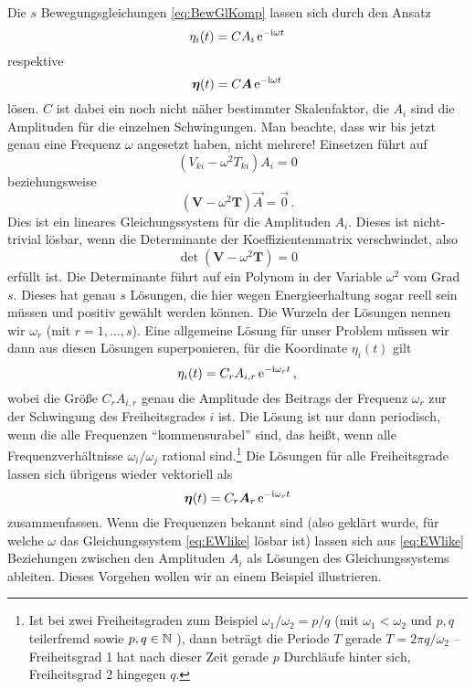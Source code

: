 \documentclass[paper=a4, fontsize=11.0pt, abstractoff, DIV12]{scrartcl}
\begin{document}
Die $s$ Bewegungsgleichungen \eqref{eq:BewGlKomp} lassen sich durch den Ansatz
\begin{equation}
\eta_i(t) = C A_i \,{\mathrm{e}}^{-\mathrm{i} \omega t}
\end{equation}
respektive
\begin{equation}
{\ensuremath{\boldsymbol{\eta}}}(t) = C {\boldsymbol{A}} \,{\mathrm{e}}^{-\mathrm{i} \omega t}
\end{equation}
lösen. $C$ ist dabei ein noch nicht näher bestimmter Skalenfaktor, die $A_i$
sind die Amplituden für die einzelnen Schwingungen. Man beachte, dass wir
bis jetzt genau eine Frequenz $\omega$ angesetzt haben, nicht mehrere!
Einsetzen führt auf
\begin{equation}
\left(V_{ki} - \omega^2 T_{ki} \right)A_i = 0
\end{equation}
beziehungsweise
\begin{equation}
\left(\mathbf{V} - \omega^2\mathbf{T}\right)\vec{A} = \vec 0\, .
\label{eq:EWlike}
\end{equation}
Dies ist ein lineares Gleichungssystem für die Amplituden $A_i$. Dieses ist
nicht-trivial lösbar, wenn die Determinante der Koeffizientenmatrix
verschwindet, also
\begin{equation}
\det \left(\mathbf{V} - \omega^2\mathbf{T} \right) = 0
\label{eq:Det}
\end{equation}
erfüllt ist. Die Determinante führt auf ein Polynom in der Variable
$\omega^2$ vom Grad $s$. Dieses hat genau $s$ Lösungen, die hier wegen
Energieerhaltung sogar reell sein müssen und positiv gewählt werden können.
Die Wurzeln der Lösungen nennen wir $\omega_r$ (mit $r=1,\dots,s$). Eine
allgemeine Lösung für unser Problem müssen wir dann aus diesen Lösungen
superponieren, für die Koordinate $\eta_i(t)$ gilt
\begin{equation}
\eta_i(t) = C_r A_{i,r} \,{\mathrm{e}}^{-\mathrm{i} \omega_r t}\, ,
\label{eq:SchwingR}
\end{equation}
wobei die Größe $C_r A_{i,r}$ genau die Amplitude des Beitrags der Frequenz
$\omega_r$ zur der Schwingung des Freiheitsgrades $i$ ist. Die Lösung ist
nur dann periodisch, wenn die alle Frequenzen ``kommensurabel'' sind, das
heißt, wenn alle Frequenzverhältnisse $\omega_i/\omega_j$ rational
sind.\footnote{Ist bei zwei Freiheitsgraden zum Beispiel $\omega_1/\omega_2 = p/q$
(mit $\omega_1 < \omega_2$ und $p,q$ teilerfremd sowie $p,q \in \mathbb{N}$
), dann beträgt die Periode $T$ gerade $T=2\pi q/\omega_2$ -- Freiheitsgrad
1 hat nach dieser Zeit gerade $p$ Durchläufe hinter sich, Freiheitsgrad 2
hingegen $q$.} Die Lösungen für alle Freiheitsgrade lassen sich übrigens
wieder vektoriell als
\begin{equation}
{\ensuremath{\boldsymbol{\eta}}}(t) = C_r {\boldsymbol{A}}_r \,{\mathrm{e}}^{-\mathrm{i}\omega_r t}
\label{eq:BewLsg}
\end{equation}
zusammenfassen. Wenn die Frequenzen bekannt sind (also geklärt wurde, für
welche $\omega$ das Gleichungssystem \eqref{eq:EWlike} lösbar ist) lassen sich
aus \eqref{eq:EWlike} Beziehungen zwischen den Amplituden $A_i$ als Lösungen
des Gleichungssystems ableiten. Dieses Vorgehen wollen wir an einem Beispiel
illustrieren.
\end{document}
